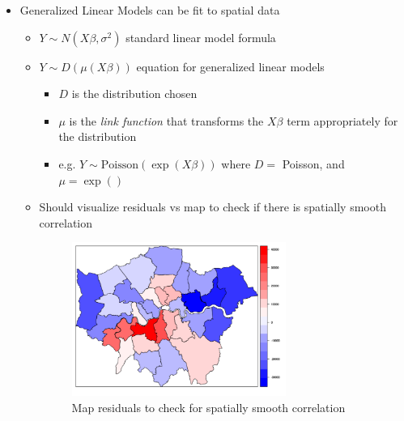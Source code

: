 \documentclass{article}
\begin{document}
\begin{itemize}
\begin{itemize}
\begin{itemize}
        \end{itemize}
    \end{itemize}
    \item Generalized Linear Models can be fit to spatial data
    \begin{itemize}
        \item $Y \sim N(X \beta, \sigma^2)$ standard linear model formula
        \item $Y \sim D(\mu(X \beta))$ equation for generalized linear models
        \begin{itemize}
            \item $D$ is the distribution chosen
            \item $\mu$ is the \textit{link function} that transforms the $X \beta$ term appropriately for the distribution
            \item e.g. $Y \sim \text{Poisson}(\exp(X \beta))$ where $D =$ Poisson, and $\mu = \exp()$ 
        \end{itemize}
        \item Should visualize residuals vs map to check if there is spatially smooth correlation
        
        \begin{figure}[h]
            \centering
            \caption{Map residuals to check for spatially smooth correlation}
            \label{spatial residuals}
            \includegraphics[width=7cm]{spatial-residuals.png}
        \end{figure}


\end{itemize}
\end{itemize}
\end{document}
